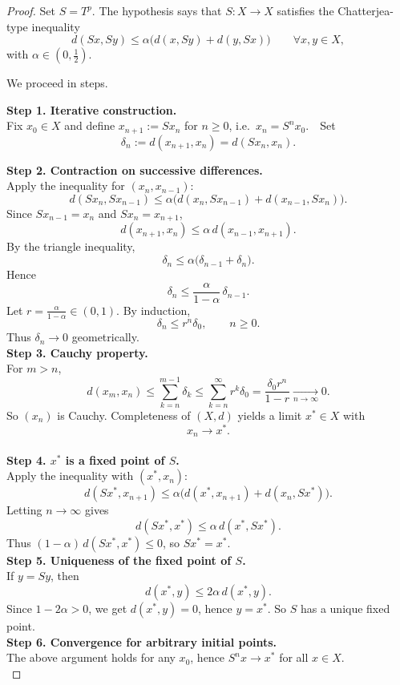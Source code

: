 \documentclass[12pt]{article}
\begin{document}
\begin{proof}
Set $S=T^p$. The hypothesis says that $S:X\to X$ satisfies the Chatterjea-type inequality
\[d(Sx,Sy)\le \alpha\big(d(x,Sy)+d(y,Sx)\big)\qquad\forall x,y\in X,\]
with $\alpha\in(0,\tfrac12)$. 

We proceed in steps.

\medskip\noindent\textbf{Step 1. Iterative construction.}\\
Fix $x_0\in X$ and define $x_{n+1}:=Sx_n$ for $n\ge0$, i.e.\ $x_n=S^n x_0$.  Set\[\delta_n:=d(x_{n+1},x_n)=d(Sx_n,x_n).\]

\medskip\noindent\textbf{Step 2. Contraction on successive differences.}\\
Apply the inequality for $(x_n,x_{n-1})$:\[d(Sx_n,Sx_{n-1})\le \alpha\big(d(x_n,Sx_{n-1})+d(x_{n-1},Sx_n)\big).\]
Since $Sx_{n-1}=x_n$ and $Sx_n=x_{n+1}$,\[d(x_{n+1},x_n)\le \alpha\, d(x_{n-1},x_{n+1}).\]
By the triangle inequality,
\[\delta_n \le \alpha\big(\delta_{n-1}+\delta_n\big).\]Hence\[\delta_n \le \frac{\alpha}{1-\alpha}\,\delta_{n-1}.\]
Let $r=\tfrac{\alpha}{1-\alpha}\in(0,1)$. 
By induction,
\[\delta_n \le r^n \delta_0,\qquad n\ge0.\]Thus $\delta_n\to0$ 
geometrically.\\

\medskip\noindent\textbf{Step 3. Cauchy property.}\\
For $m>n$,\[d(x_m,x_n)\le \sum_{k=n}^{m-1}\delta_k \le \sum_{k=n}^\infty r^k\delta_0= \frac{\delta_0 r^n}{1-r}\xrightarrow[n\to\infty]{}0.\]So $(x_n)$ is Cauchy. 
Completeness of $(X,d)$ yields a limit $x^\ast\in X$ with\[x_n \to x^\ast.\]\\

\medskip\noindent\textbf{Step 4. $x^\ast$ is a fixed point of $S$.}\\
Apply the inequality with 
$(x^\ast,x_n)$:\[d(Sx^\ast,x_{n+1})\le \alpha\big(d(x^\ast,x_{n+1})+d(x_n,Sx^\ast)\big).\]
Letting $n\to\infty$ gives
\[d(Sx^\ast,x^\ast)\le \alpha\,d(x^\ast,Sx^\ast).\]
Thus 
$(1-\alpha)\,d(Sx^\ast,x^\ast)\le0$, 
so $Sx^\ast=x^\ast$.\\

\medskip\noindent\textbf{Step 5. Uniqueness of the fixed point of $S$.}\\
If $y=Sy$, then\[d(x^\ast,y)\le 2\alpha\,d(x^\ast,y).\]
Since $1-2\alpha>0$, 
we get $d(x^\ast,y)=0$, 
hence $y=x^\ast$. So $S$ has a unique fixed point.\\

\medskip\noindent\textbf{Step 6. Convergence for arbitrary initial points.}\\
The above argument holds for any $x_0$, 
hence $S^n x\to x^\ast$ for all $x\in X$.\\


\end{proof}
\end{document}
